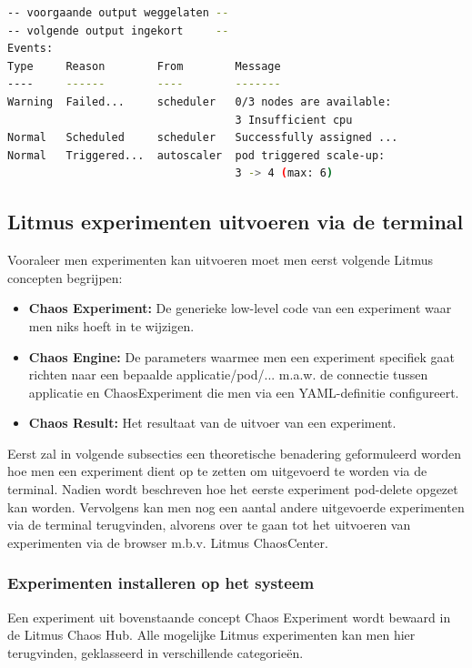 \begin{lstlisting}[language=bash]
-- voorgaande output weggelaten --
-- volgende output ingekort     --
Events:
Type     Reason        From        Message
----     ------        ----        -------
Warning  Failed...     scheduler   0/3 nodes are available: 
                                   3 Insufficient cpu
Normal   Scheduled     scheduler   Successfully assigned ... 
Normal   Triggered...  autoscaler  pod triggered scale-up: 
                                   3 -> 4 (max: 6)
\end{lstlisting}

\subsection{Litmus experimenten uitvoeren via de terminal}

Vooraleer men experimenten kan uitvoeren moet men eerst volgende Litmus concepten begrijpen:
\begin{itemize}
    \item {\bf Chaos Experiment:} De generieke low-level code van een experiment waar men niks hoeft in te wijzigen.
    \item {\bf Chaos Engine:} De parameters waarmee men een experiment specifiek gaat richten naar een bepaalde applicatie/pod/... m.a.w. de connectie tussen applicatie en ChaosExperiment die men via een YAML-definitie configureert.
    \item {\bf Chaos Result:} Het resultaat van de uitvoer van een experiment. 
\end{itemize} 
 
Eerst zal in volgende subsecties een theoretische benadering geformuleerd worden hoe men een experiment dient op te zetten om uitgevoerd te worden via de terminal. Nadien wordt beschreven hoe het eerste experiment pod-delete opgezet kan worden. Vervolgens kan men nog een aantal andere uitgevoerde experimenten via de terminal terugvinden, alvorens over te gaan tot het uitvoeren van experimenten via de browser m.b.v. Litmus ChaosCenter.
 
\subsubsection{Experimenten installeren op het systeem}
\label{subsec:experimenteninstalleren}

Een experiment uit bovenstaande concept Chaos Experiment wordt bewaard in de Litmus Chaos Hub.  
Alle mogelijke Litmus experimenten kan men hier terugvinden, geklasseerd in verschillende categorieën. \autocite{ChaosHub2022} 

